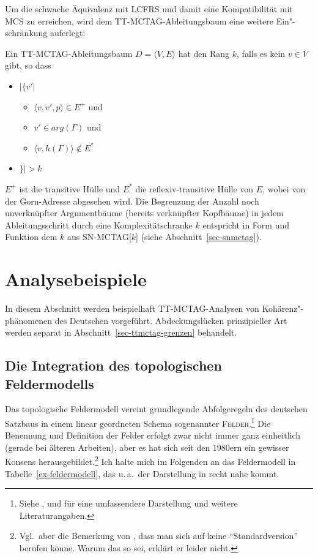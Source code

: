 Um die schwache Äquivalenz mit LCFRS und damit eine Kompatibilität mit MCS zu erreichen, wird dem TT-MCTAG-Ableitungsbaum eine weitere Ein"-schränkung auferlegt:
\begin{definition}[$k$-TT-MCTAG] Ein TT-MCTAG-Ableitungsbaum $D = \langle V,E \rangle$ hat den Rang $k$, falls es kein $v \in V$ gibt, so dass
\begin{itemize}
  \item[] $|\{ v'| $ 
  \begin{itemize}
  \item[]$\langle v,v',p\rangle \in E^+ $ und 
  \item[]$v' \in arg(\Gamma)$ und 
  \item[]$ \langle v,h(\Gamma)\rangle \not\in E^*$ 
  \end{itemize} 
  \item[]$\}|  > k$  
\end{itemize}
\end{definition}
$E^+$ ist die transitive Hülle und $E^*$ die reflexiv-transitive Hülle von $E$, wobei von der Gorn-Adresse abgesehen wird.
Die Begrenzung der Anzahl noch unverknüpfter Argumentbäume (bereits verknüpfter Kopfbäume) in jedem Ableitungsschritt durch eine Komplexitätschranke $k$ entspricht in Form und Funktion dem $k$ aus SN-MCTAG[$k$] (siehe Abschnitt~\ref{sec-snmctag}).  

\section{Analysebeispiele} \label{sec-ttmctag-beispiele}

In diesem Abschnitt werden beispielhaft TT-MCTAG-Analysen von Kohärenz"-phänomenen des Deutschen vorgeführt. Abdeckungslücken prinzipieller Art werden separat in Abschnitt~\ref{sec-ttmctag-grenzen} behandelt. 

\subsection{Die Integration des topologischen Feldermodells}\label{sec-feldermodell}

Das topologische Feldermodell vereint grundlegende Abfolgeregeln des deutschen Satzbaus in einem linear geordneten Schema sogenannter \textsc{Felder}.\footnote{Siehe \cite{Reis:80}, \cite{Askedal:86} und \cite{Hoehle:86} für eine umfassendere Darstellung und weitere Literaturangaben.} Die Benennung und Definition der Felder erfolgt zwar nicht immer ganz einheitlich (gerade bei älteren Arbeiten), aber es hat sich seit den 1980ern ein gewisser Konsens herausgebildet.\footnote{Vgl.\ aber die Bemerkung von \citet[286]{Sternefeld:06}, dass man sich auf keine "`Standardversion"' berufen könne. Warum das so sei, erklärt er leider nicht.} Ich halte mich im Folgenden an das  Feldermodell in Tabelle~\ref{ex-feldermodell}, das u.\,a.\ der Darstellung in \citet[216ff]{Askedal:86} recht nahe kommt. 

